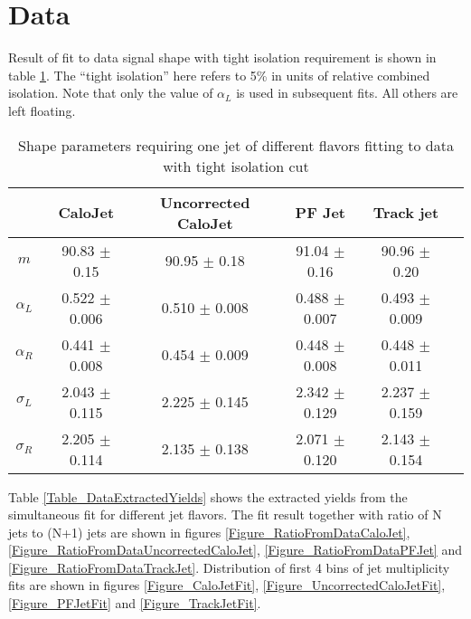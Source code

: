 \documentclass{cmspaper}
\begin{document}
\section{Data}


Result of fit to data signal shape with tight isolation requirement is
shown in table \ref{Table_DataAlphaL}.  The ``tight isolation'' here
refers to 5\% in units of relative combined isolation.  Note that only
the value of $\alpha_L$ is used in subsequent fits.  All others are
left floating.

\begin{table}[htbp]
\caption{Shape parameters requiring one jet of different flavors fitting to data with tight isolation cut}
\centering
   \begin{tabular}{|c|c|c|c|c|c|}
      \hline
      & CaloJet & Uncorrected CaloJet & PF Jet & Track jet \\\hline
      $m$ & 90.83 $\pm$ 0.15 & 90.95 $\pm$ 0.18 & 91.04 $\pm$ 0.16 & 90.96 $\pm$ 0.20 \\\hline
      $\alpha_L$ & 0.522 $\pm$ 0.006 & 0.510 $\pm$ 0.008 & 0.488 $\pm$ 0.007 & 0.493 $\pm$ 0.009 \\\hline
      $\alpha_R$ & 0.441 $\pm$ 0.008 & 0.454 $\pm$ 0.009 & 0.448 $\pm$ 0.008 & 0.448 $\pm$ 0.011 \\\hline
      $\sigma_L$ & 2.043 $\pm$ 0.115 & 2.225 $\pm$ 0.145 & 2.342 $\pm$ 0.129 & 2.237 $\pm$ 0.159 \\\hline
      $\sigma_R$ & 2.205 $\pm$ 0.114 & 2.135 $\pm$ 0.138 & 2.071 $\pm$ 0.120 & 2.143 $\pm$ 0.154 \\\hline
   \end{tabular}
   \label{Table_DataAlphaL}
\end{table}

Table \ref{Table_DataExtractedYields} shows the extracted yields from
the simultaneous fit for different jet flavors.  The fit result
together with ratio of N jets to (N+1) jets are shown in figures
\ref{Figure_RatioFromDataCaloJet},
\ref{Figure_RatioFromDataUncorrectedCaloJet},
\ref{Figure_RatioFromDataPFJet} and
\ref{Figure_RatioFromDataTrackJet}.  Distribution of first 4 bins of
jet multiplicity fits are shown in figures \ref{Figure_CaloJetFit},
\ref{Figure_UncorrectedCaloJetFit}, \ref{Figure_PFJetFit} and
\ref{Figure_TrackJetFit}.
\end{document}

